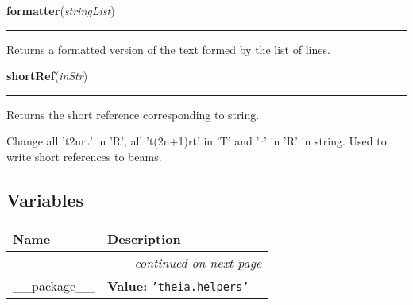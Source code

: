     \vspace{0.5ex}

\hspace{.8\funcindent}\begin{boxedminipage}{\funcwidth}

    \raggedright \textbf{formatter}(\textit{stringList})

    \vspace{-1.5ex}

    \rule{\textwidth}{0.5\fboxrule}
\setlength{\parskip}{2ex}
    Returns a formatted version of the text formed by the list of lines.

\setlength{\parskip}{1ex}
    \end{boxedminipage}

    \label{theia:helpers:tools:shortRef}

    \vspace{0.5ex}

\hspace{.8\funcindent}\begin{boxedminipage}{\funcwidth}

    \raggedright \textbf{shortRef}(\textit{inStr})

    \vspace{-1.5ex}

    \rule{\textwidth}{0.5\fboxrule}
\setlength{\parskip}{2ex}
    Returns the short reference corresponding to string.

    Change all 't2nrt' in 'R', all 't(2n+1)rt' in 'T' and 'r' in 'R' in 
    string. Used to write short references to beams.

\setlength{\parskip}{1ex}
    \end{boxedminipage}



  \subsection{Variables}

    \vspace{-1cm}
\hspace{\varindent}\begin{longtable}{|p{\varnamewidth}|p{\vardescrwidth}|l}
\cline{1-2}
\cline{1-2} \centering \textbf{Name} & \centering \textbf{Description}& \\
\cline{1-2}
\endhead\cline{1-2}\multicolumn{3}{r}{\small\textit{continued on next page}}\\\endfoot\cline{1-2}
\endlastfoot\raggedright \_\-\_\-p\-a\-c\-k\-a\-g\-e\-\_\-\_\- & \raggedright \textbf{Value:} 
{\tt \texttt{'}\texttt{theia.helpers}\texttt{'}}&\\
\cline{1-2}
\end{longtable}



